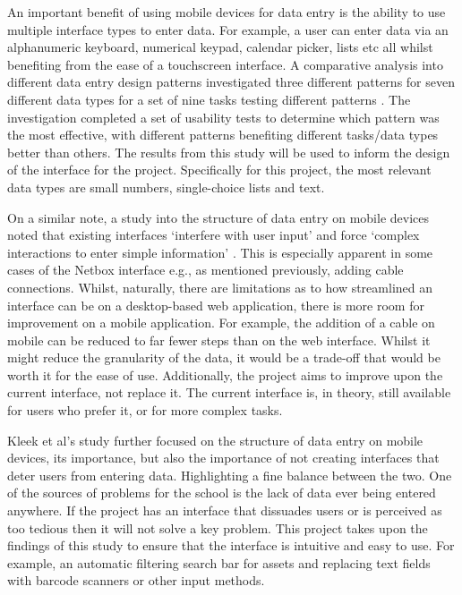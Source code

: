 \documentclass [11pt,a4paper]{article}
\begin{document}
An important benefit of using mobile devices for data entry is the ability to use multiple interface types to enter data. For example, a user can enter data via an alphanumeric keyboard, numerical keypad, calendar picker, lists etc all whilst benefiting from the ease of a touchscreen interface. A comparative analysis into different data entry design patterns investigated three different patterns for seven different data types for a set of nine tasks testing different patterns \cite{myka2019comparative}. The investigation completed a set of usability tests to determine which pattern was the most effective, with different patterns benefiting different tasks/data types better than others. The results from this study will be used to inform the design of the interface for the project. Specifically for this project, the most relevant data types are small numbers, single-choice lists and text.

On a similar note, a study into the structure of data entry on mobile devices noted that existing interfaces `interfere with user input' and force `complex interactions to enter simple information' \cite{van2007gui}. This is especially apparent in some cases of the Netbox interface e.g., as mentioned previously, adding cable connections. Whilst, naturally, there are limitations as to how streamlined an interface can be on a desktop-based web application, there is more room for improvement on a mobile application. For example, the addition of a cable on mobile can be reduced to far fewer steps than on the web interface. Whilst it might reduce the granularity of the data, it would be a trade-off that would be worth it for the ease of use. Additionally, the project aims to improve upon the current interface, not replace it. The current interface is, in theory, still available for users who prefer it, or for more complex tasks.

Kleek et al's \cite{van2007gui} study further focused on the structure of data entry on mobile devices, its importance, but also the importance of not creating interfaces that deter users from entering data. Highlighting a fine balance between the two. One of the sources of problems for the school is the lack of data ever being entered anywhere. If the project has an interface that dissuades users or is perceived as too tedious then it will not solve a key problem. This project takes upon the findings of this study to ensure that the interface is intuitive and easy to use. For example, an automatic filtering search bar for assets and replacing text fields with barcode scanners or other input methods.
\end{document}
